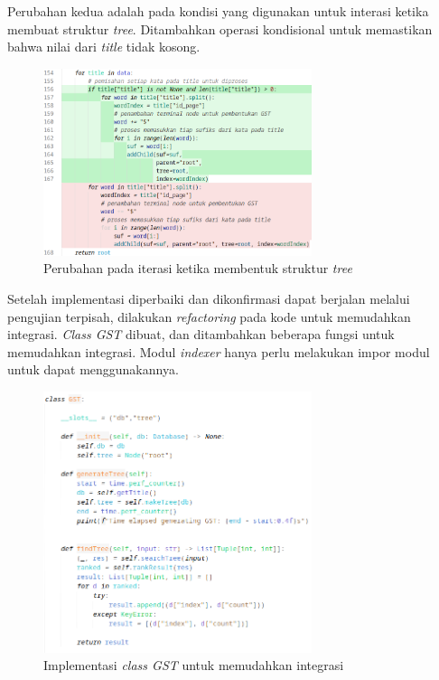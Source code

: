 Perubahan kedua adalah pada kondisi yang digunakan untuk interasi ketika membuat 
struktur \textit{tree}. Ditambahkan operasi kondisional untuk memastikan bahwa 
nilai dari \textit{title} tidak kosong.

\begin{figure}[H]
  \centering{}
	\includegraphics[width=0.7\textwidth]{gambar/implementasi_gstchange3}
  \caption{Perubahan pada iterasi ketika membentuk struktur \textit{tree}}
\end{figure}

Setelah implementasi diperbaiki dan dikonfirmasi dapat berjalan melalui 
pengujian terpisah, dilakukan \textit{refactoring} pada kode untuk memudahkan 
integrasi. \textit{Class GST} dibuat, dan ditambahkan beberapa fungsi untuk 
memudahkan integrasi. Modul \textit{indexer} hanya perlu melakukan impor modul 
untuk dapat menggunakannya.

\begin{figure}[H]
  \centering{}
	\includegraphics[width=0.7\textwidth]{gambar/implementasi_gst}
  \caption{Implementasi \textit{class GST} untuk memudahkan integrasi}
\end{figure}

